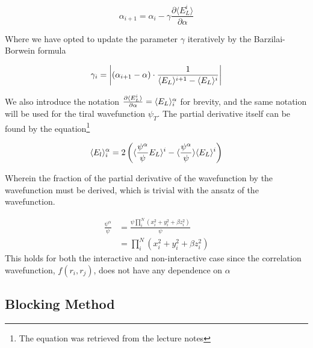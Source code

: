 \begin{equation}
\alpha_{i+1} = \alpha_i -\gamma \frac{\partial \langle E_L^i \rangle}{\partial \alpha}
\end{equation}

\noindent Where we have opted to update the parameter $\gamma$ iteratively by the Barzilai-Borwein formula 

\begin{equation}
\gamma_i = \left |(\alpha_{i+1} - \alpha) \cdot \frac{1}{\langle E_L \rangle^{i+1} - \langle E_L \rangle^i}\right|
\end{equation}

\noindent We also introduce the notation $\frac{\partial \langle E_L^i \rangle}{\partial \alpha} = \langle E_L \rangle^\alpha_{i}$ for brevity, and the same notation will be used for the tiral wavefunction $\psi_T$. The partial derivative itself can be found by the equation\footnote{The equation was retrieved from the lecture notes} 

\begin{equation}
\langle E_l \rangle^\alpha_{i} = 2 \left(\langle \frac{\psi^\alpha}{\psi} E_L \rangle^i - \langle \frac{\psi^\alpha}{\psi} \rangle\langle E_L \rangle^i \right)
\end{equation} 

\noindent Wherein the fraction of the partial derivative of the wavefunction by the wavefunction must be derived, which is trivial with the ansatz of the wavefunction. 


\begin{align}
\frac{\psi^\alpha}{\psi} &= \frac{\psi \prod_i^N (x_i^2 + y_i^2 + \beta z^2_i)}{\psi} \\
&= \prod_i^N (x_i^2 + y_i^2 + \beta z^2_i)
\end{align}
\noindent This holds for both the interactive and non-interactive case since the correlation wavefunction, $f(r_i, r_j)$, does not have any dependence on $\alpha$

\subsection{Blocking Method}

